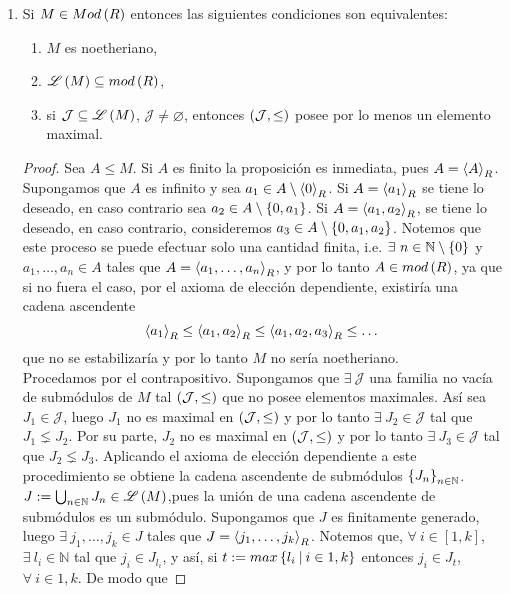 \documentclass{article}
\begin{document}
\begin{enumerate}[label=\textbf{Ej \arabic*.}]
\begin{proof}
			Ahora, si $g$ es supra, la sucesión \\$0\longrightarrow Ker(g) \stackrel{i}{\longrightarrow} M
			\stackrel{g}{\longrightarrow} Im(g)=M \longrightarrow 0$ es exacta, por lo que\\ $l(M)=l(M)+l(Ker(g))$, y como $l(M)$ es finita, entonces 
			$l(Ker(g))=0$, es decir, $Ker(g)=0$ entonces $g$ es inyectiva.
		\end{proof}
		
		\item Si $M\in Mod\left(R\right)$ entonces las siguientes condiciones son equivalentes:
		\begin{enumerate}
			\item $M$ es noetheriano,
			\item $\mathscr{L}\left(M\right)\subseteq mod\left(R\right)$,
			\item si $\mathcal{J}\subseteq\mathscr{L}\left(M\right)$, $\mathcal{J}\neq\varnothing$, entonces $\left(\mathcal{J},\leq\right)$ posee por lo menos un elemento maximal.
		\end{enumerate}
		\begin{proof}
			 Sea $A\leq M$. Si $A$ es finito la proposición es inmediata, pues $A=\left< A\right>_{R}$. Supongamos que $A$ es infinito y sea  $a_1\in A\setminus\left< 0\right>_{R}$. Si $A=\left< a_1\right>_{R}$ se tiene lo deseado, en caso contrario sea $a_2\in A\setminus\left\{0,a_1\right\}$. Si $A=\left< a_1,a_2\right>_{R}$, se tiene lo deseado, en caso contrario, consideremos $a_3\in A\setminus\left\{0,a_1,a_2\right\}$. Notemos que este proceso se puede efectuar solo una cantidad finita, i.e. $\exists\ n\in\mathbb{N}\setminus\left\{0\right\}$ y $a_1,\dotsc,a_n\in A$ tales que $A=\left< a_1,\dotsc,a_n\right>_{R}$, y por lo tanto $A\in mod\left(R\right)$, ya que si no fuera el caso, por el axioma de elección dependiente, existiría una cadena ascendente
			\begin{equation*}
				\left< a_1\right>_{R}\leq \left< a_1,a_2\right>_{R}\leq \left< a_1,a_2,a_3\right>_{R}\leq\dots 
			\end{equation*}
			que no se estabilizaría y por lo tanto $M$ no sería noetheriano.\\
			 Procedamos por el contrapositivo. Supongamos que $\exists\ \mathcal{J}$ una familia no vacía de submódulos de $M$ tal $\left(\mathcal{J},\leq\right)$ que no posee elementos maximales. Así sea $J_1\in\mathcal{J}$, luego $J_1$ no es maximal en $\left(\mathcal{J},\leq\right)$ y por lo tanto $\exists\ J_2\in\mathcal{J}$ tal que $J_1\lneq J_2$. Por su parte, $J_2$ no es maximal en $\left(\mathcal{J},\leq\right)$ y por lo tanto $\exists\ J_3\in\mathcal{J}$ tal que $J_2\lneq J_3$. Aplicando el axioma de elección dependiente a este procedimiento se obtiene la cadena ascendente de submódulos ${\left\{{J}_{n}\right\}}_{n\in \mathbb{N}}$. $J:=\bigcup_{n\in\mathbb{N}}J_n\in\mathscr{L}\left(M\right)$,pues la unión de una cadena ascendente de submódulos es un submódulo. Supongamos que $J$ es finitamente generado, luego $\exists\ j_1,\dotsc,j_k\in J$ tales que $J=\left< j_1,\dotsc,j_k\right>_{R}$. Notemos que, $\forall\ i\in[1,k]$, $\exists\ l_i\in\mathbb{N}$ tal que $j_i\in J_{l_i}$, y así, si $t:=max\lrbrack{l_i\ \vline\ i\in{1,k}}$ entonces $j_i\in J_t$, $\forall\ i\in{1,k}$. De modo que

\end{proof}
\end{enumerate}
\end{document}
